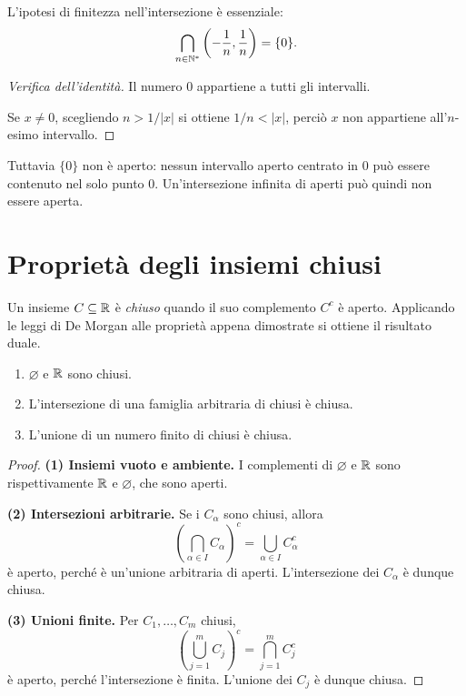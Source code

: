 \begin{esempio}
L'ipotesi di finitezza nell'intersezione è essenziale:
\[
  \bigcap_{n\in\mathbb{N}^*}\left(-\frac1n,\frac1n\right)=\{0\}.
\]
\begin{proof}[Verifica dell'identità]
 Il numero $0$ appartiene a tutti gli intervalli.

 Se $x\ne0$, scegliendo $n>1/|x|$ si ottiene $1/n<|x|$, perciò $x$ non appartiene all'$n$-esimo intervallo.
\end{proof}

Tuttavia $\{0\}$ non è aperto: nessun intervallo aperto centrato in $0$ può essere contenuto nel solo punto $0$. Un'intersezione infinita di aperti può quindi non essere aperta.
\end{esempio}

\section{Proprietà degli insiemi chiusi}

Un insieme $C\subseteq\mathbb{R}$ è \emph{chiuso} quando il suo complemento $C^c$ è aperto. Applicando le leggi di De Morgan alle proprietà appena dimostrate si ottiene il risultato duale.

\begin{proposizione}
\leavevmode
\begin{enumerate}[label=\arabic*.]
  \item $\varnothing$ e $\mathbb{R}$ sono chiusi.
  \item L'intersezione di una famiglia arbitraria di chiusi è chiusa.
  \item L'unione di un numero finito di chiusi è chiusa.
\end{enumerate}
\end{proposizione}

\begin{proof}
\textbf{(1) Insiemi vuoto e ambiente.} I complementi di $\varnothing$ e $\mathbb{R}$ sono rispettivamente $\mathbb{R}$ e $\varnothing$, che sono aperti.

\textbf{(2) Intersezioni arbitrarie.} Se i $C_\alpha$ sono chiusi, allora
\[
  \left(\bigcap_{\alpha\in I}C_\alpha\right)^c
  =\bigcup_{\alpha\in I}C_\alpha^c
\]
è aperto, perché è un'unione arbitraria di aperti. L'intersezione dei $C_\alpha$ è dunque chiusa.

\textbf{(3) Unioni finite.} Per $C_1,\ldots,C_m$ chiusi,
\[
  \left(\bigcup_{j=1}^{m}C_j\right)^c
  =\bigcap_{j=1}^{m}C_j^c
\]
è aperto, perché l'intersezione è finita. L'unione dei $C_j$ è dunque chiusa.
\end{proof}

